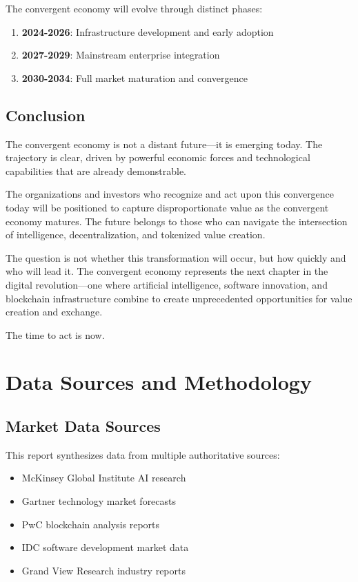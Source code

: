\documentclass[11pt,a4paper]{report}
\begin{document}
The convergent economy will evolve through distinct phases:

\begin{enumerate}
\item \textbf{2024-2026}: Infrastructure development and early adoption
\item \textbf{2027-2029}: Mainstream enterprise integration
\item \textbf{2030-2034}: Full market maturation and convergence
\end{enumerate}

\section{Conclusion}

The convergent economy is not a distant future---it is emerging today. The trajectory is clear, driven by powerful economic forces and technological capabilities that are already demonstrable.

The organizations and investors who recognize and act upon this convergence today will be positioned to capture disproportionate value as the convergent economy matures. The future belongs to those who can navigate the intersection of intelligence, decentralization, and tokenized value creation.

The question is not whether this transformation will occur, but how quickly and who will lead it. The convergent economy represents the next chapter in the digital revolution---one where artificial intelligence, software innovation, and blockchain infrastructure combine to create unprecedented opportunities for value creation and exchange.

The time to act is now.

\appendix
\chapter{Data Sources and Methodology}

\section{Market Data Sources}

This report synthesizes data from multiple authoritative sources:

\begin{itemize}
\item McKinsey Global Institute AI research
\item Gartner technology market forecasts
\item PwC blockchain analysis reports
\item IDC software development market data
\item Grand View Research industry reports
\end{itemize}
\end{document}
